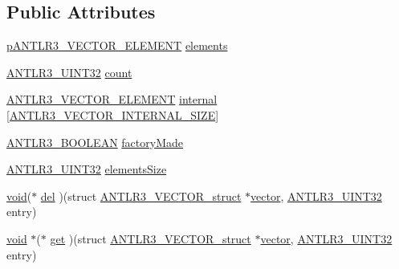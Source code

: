 \subsection*{Public Attributes}
\begin{DoxyCompactItemize}
\item 
\hyperlink{antlr3collections_8h_a5effc0d4051a1f31330e641ed807c161}{p\-A\-N\-T\-L\-R3\-\_\-\-V\-E\-C\-T\-O\-R\-\_\-\-E\-L\-E\-M\-E\-N\-T} \hyperlink{struct_a_n_t_l_r3___v_e_c_t_o_r__struct_aa8e5e1c014f50572d08605b08c1ab7f0}{elements}
\item 
\hyperlink{antlr3defs_8h_ac41f744abd0fd25144b9eb9d11b1dfd1}{A\-N\-T\-L\-R3\-\_\-\-U\-I\-N\-T32} \hyperlink{struct_a_n_t_l_r3___v_e_c_t_o_r__struct_a2159aa5b605c317c00ab0089dc45a7e9}{count}
\item 
\hyperlink{antlr3collections_8h_abfda13563fcaed6ee2b14934bd5c4d20}{A\-N\-T\-L\-R3\-\_\-\-V\-E\-C\-T\-O\-R\-\_\-\-E\-L\-E\-M\-E\-N\-T} \hyperlink{struct_a_n_t_l_r3___v_e_c_t_o_r__struct_a57e417ac29bbcfc10826c0f61c18acc9}{internal} \mbox{[}\hyperlink{antlr3collections_8h_a2dd8f0741b3d0242c8aaa7eccfc8f015}{A\-N\-T\-L\-R3\-\_\-\-V\-E\-C\-T\-O\-R\-\_\-\-I\-N\-T\-E\-R\-N\-A\-L\-\_\-\-S\-I\-Z\-E}\mbox{]}
\item 
\hyperlink{antlr3defs_8h_a5b33dccbba3b7212539695e21df4079b}{A\-N\-T\-L\-R3\-\_\-\-B\-O\-O\-L\-E\-A\-N} \hyperlink{struct_a_n_t_l_r3___v_e_c_t_o_r__struct_a7dabfe6d9965de22b4c2a8ab57c4bdde}{factory\-Made}
\item 
\hyperlink{antlr3defs_8h_ac41f744abd0fd25144b9eb9d11b1dfd1}{A\-N\-T\-L\-R3\-\_\-\-U\-I\-N\-T32} \hyperlink{struct_a_n_t_l_r3___v_e_c_t_o_r__struct_ae138b005f2bcd128d9c78209839319b5}{elements\-Size}
\item 
\hyperlink{struct_a_n_t_l_r3___v_e_c_t_o_r__struct_ad1bb7dd18a16a705bf899dee6e15131d}{void}($\ast$ \hyperlink{struct_a_n_t_l_r3___v_e_c_t_o_r__struct_a39648fceba2df70f8b75d75e7d586ae3}{del} )(struct \hyperlink{struct_a_n_t_l_r3___v_e_c_t_o_r__struct}{A\-N\-T\-L\-R3\-\_\-\-V\-E\-C\-T\-O\-R\-\_\-struct} $\ast$\hyperlink{qmb_8m_af54b69a32590de218622e869b06b47b3}{vector}, \hyperlink{antlr3defs_8h_ac41f744abd0fd25144b9eb9d11b1dfd1}{A\-N\-T\-L\-R3\-\_\-\-U\-I\-N\-T32} entry)
\item 
\hyperlink{struct_a_n_t_l_r3___v_e_c_t_o_r__struct_ad1bb7dd18a16a705bf899dee6e15131d}{void} $\ast$($\ast$ \hyperlink{struct_a_n_t_l_r3___v_e_c_t_o_r__struct_a784acc56b2e82f3076691f7b1b28e279}{get} )(struct \hyperlink{struct_a_n_t_l_r3___v_e_c_t_o_r__struct}{A\-N\-T\-L\-R3\-\_\-\-V\-E\-C\-T\-O\-R\-\_\-struct} $\ast$\hyperlink{qmb_8m_af54b69a32590de218622e869b06b47b3}{vector}, \hyperlink{antlr3defs_8h_ac41f744abd0fd25144b9eb9d11b1dfd1}{A\-N\-T\-L\-R3\-\_\-\-U\-I\-N\-T32} entry)

\end{DoxyCompactItemize}
